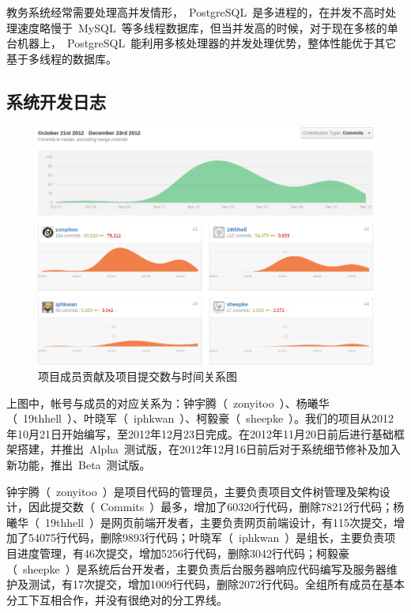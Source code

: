 教务系统经常需要处理高并发情形，~PostgreSQL~是多进程的，在并发不高时处理速度略慢于~MySQL~等多线程数据库，但当并发高的时候，对于现在多核的单台机器上，~PostgreSQL~能利用多核处理器的并发处理优势，整体性能优于其它基于多线程的数据库。

\newpage
\begin{center}
  \section{系统开发日志}
\end{center}

\begin{figure}[H]
   \centering \includegraphics[width=\textwidth]{img/contrib.png}
   \caption{项目成员贡献及项目提交数与时间关系图}
\end{figure}

上图中，帐号与成员的对应关系为：钟宇腾（~zonyitoo~）、杨曦华（~19thhell~）、叶晓军（~iphkwan~）、柯毅豪（~sheepke~）。我们的项目从2012年10月21日开始编写，至2012年12月23日完成。在2012年11月20日前后进行基础框架搭建，并推出~Alpha~测试版，在2012年12月16日前后对于系统细节修补及加入新功能，推出~Beta~测试版。

钟宇腾（~zonyitoo~）是项目代码的管理员，主要负责项目文件树管理及架构设计，因此提交数（~Commits~）最多，增加了60320行代码，删除78212行代码；杨曦华（~19thhell~）是网页前端开发者，主要负责网页前端设计，有115次提交，增加了54075行代码，删除9893行代码；叶晓军（~iphkwan~）是组长，主要负责项目进度管理，有46次提交，增加5256行代码，删除3042行代码；柯毅豪（~sheepke~）是系统后台开发者，主要负责后台服务器响应代码编写及服务器维护及测试，有17次提交，增加1009行代码，删除2072行代码。全组所有成员在基本分工下互相合作，并没有很绝对的分工界线。

